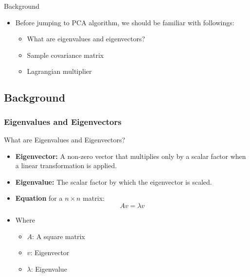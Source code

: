\documentclass[serif, aspectratio=169]{beamer}
\begin{document}


\begin{frame}{Background}
    \begin{itemize}
        \item Before jumping to PCA algorithm, we should be familiar with followings:
        \begin{itemize}
            \item What are eigenvalues and eigenvectors?
            \item Sample covariance matrix
            \item Lagrangian multiplier
        \end{itemize}
    \end{itemize}
\end{frame}

\subsection{Background}

\subsubsection{Eigenvalues and Eigenvectors}

\begin{frame}{What are Eigenvalues and Eigenvectors?}
    \begin{itemize}
        \item \textbf{Eigenvector:} A non-zero vector that  multiplies only by a scalar factor when a linear transformation is applied.
        \item \textbf{Eigenvalue:} The scalar factor by which the eigenvector is scaled.
        \item \textbf{Equation} for a $n \times n$ matrix:
        $$Av = \lambda v$$
        \item Where
        \begin{itemize}
            \item $A$: A square matrix
            \item $v$: Eigenvector
            \item $\lambda$: Eigenvalue
        \end{itemize}
    \end{itemize}
\end{frame}
\end{document}
